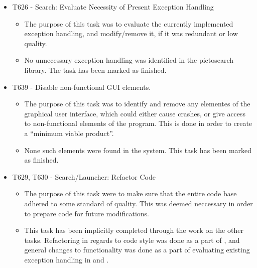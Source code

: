 \begin{itemize}
  	\item T626 - Search: Evaluate Necessity of Present Exception Handling
		\begin{itemize}
	  		\item The purpose of this task was to evaluate the currently
	  		implemented exception handling, and modify/remove it, if it was redundant or low
	  		quality.
 			\item No unnecessary exception handling was identified in the
 			pictosearch library. The task has been marked as finished.
		\end{itemize}
  	\item T639 - Disable non-functional GUI elements.
		\begin{itemize}
 			\item The purpose of this task was to identify and remove any elementes of
 			the graphical user interface, which could either cause crashes, or give
 			access to non-functional elements of the program. This is done in order to
 			create a ``minimum viable product''.
 			\item None such elements were found in the system. This task has been marked
 			as finished.
		\end{itemize}
	\item T629, T630 - Search/Launcher: Refactor Code
		\begin{itemize}
  			\item The purpose of this task were to make sure that the entire code base
  			adhered to some standard of quality. This was deemed neccessary in order to
  			prepare code for future modifications.
  			\item This task has been implicitly completed through the work on the other
  			tasks. Refactoring in regards to code style was done as a part of
  			, and general changes to functionality was done as a part of
  			evaluating existing exception handling in  and .
		\end{itemize}

\end{itemize}


